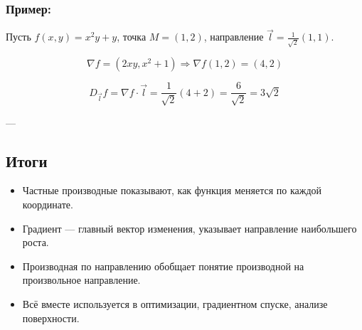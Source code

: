 \subsubsection*{Пример:}

Пусть $f(x, y) = x^2 y + y$, точка $M = (1, 2)$, направление $\vec{l} = \frac{1}{\sqrt{2}}(1, 1)$.

\[
\nabla f = \left(2x y, x^2 + 1\right) \Rightarrow
\nabla f(1,2) = (4, 2)
\]

\[
D_{\vec{l}} f = \nabla f \cdot \vec{l} = \frac{1}{\sqrt{2}}(4 + 2) = \frac{6}{\sqrt{2}} = 3\sqrt{2}
\]

---

\subsection*{Итоги}

\begin{itemize}
  \item Частные производные показывают, как функция меняется по каждой координате.
  \item Градиент — главный вектор изменения, указывает направление наибольшего роста.
  \item Производная по направлению обобщает понятие производной на произвольное направление.
  \item Всё вместе используется в оптимизации, градиентном спуске, анализе поверхности.
\end{itemize}
